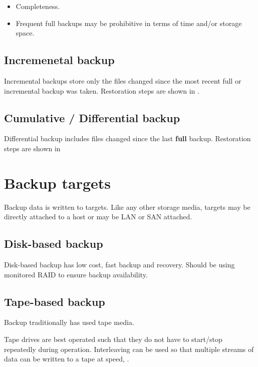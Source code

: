 \begin{itemize}
\item
  Completeness.
\item
  Frequent full backups may be prohibitive in terms of time and/or
  storage space.
\end{itemize}

\subsection{Incremenetal backup}
\label{sec:incremental-backup}

Incremental backups store only the files changed since the most recent
full or incremental backup was taken. Restoration steps are shown in .

\subsection{Cumulative / Differential backup}
\label{sec:cumulative-differential-backup}

Differential backup includes files changed since the last \textbf{full}
backup. Restoration steps are shown in

\section{Backup targets}
\label{sec:backup-targets}

Backup data is written to targets. Like any other storage media, targets
may be directly attached to a host or may be LAN or SAN attached.

\subsection{Disk-based backup}
\label{sec:disk-based-backup}

Disk-based backup has low cost, fast backup and recovery. Should be
using monitored RAID to ensure backup availability.

\subsection{Tape-based backup}
\label{sec:tape-based-backup}

Backup traditionally has used tape media.

Tape drives are best operated such that they do not have to start/stop
repeatedly during operation. Interleaving can be used so that multiple
streams of data can be written to a tape at speed, .

